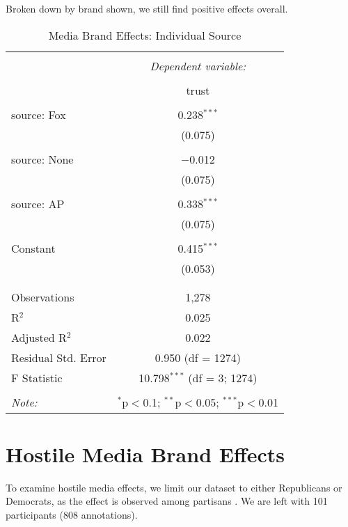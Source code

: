 Broken down by brand shown, we still find positive effects overall.
\begin{table}[!htbp] \centering 
  \caption{Media Brand Effects: Individual Source} 
  \label{} 
    \begin{tabular}{@{\extracolsep{5pt}}lc} 
    \\[-1.8ex]\hline 
    \hline \\[-1.8ex] 
     & \multicolumn{1}{c}{\textit{Dependent variable:}} \\ 
    \cline{2-2} 
    \\[-1.8ex] & trust \\ 
    \hline \\[-1.8ex] 
     source: Fox & 0.238$^{***}$ \\ 
      & (0.075) \\ 
      & \\ 
     source: None & $-$0.012 \\ 
      & (0.075) \\ 
      & \\ 
     source: AP & 0.338$^{***}$ \\ 
      & (0.075) \\ 
      & \\ 
     Constant & 0.415$^{***}$ \\ 
      & (0.053) \\ 
      & \\ 
    \hline \\[-1.8ex] 
    Observations & 1,278 \\ 
    R$^{2}$ & 0.025 \\ 
    Adjusted R$^{2}$ & 0.022 \\ 
    Residual Std. Error & 0.950 (df = 1274) \\ 
    F Statistic & 10.798$^{***}$ (df = 3; 1274) \\ 
    \hline 
    \hline \\[-1.8ex] 
    \textit{Note:}  & \multicolumn{1}{r}{$^{*}$p$<$0.1; $^{**}$p$<$0.05; $^{***}$p$<$0.01} \\ 
    \end{tabular} 
\end{table} 
\newpage



\section{Hostile Media Brand Effects}
 To examine hostile media effects, we limit our dataset to either Republicans or Democrats, as the effect is observed among partisans \cite{vallone1985hostile}. We are left with 101 participants (808 annotations).

